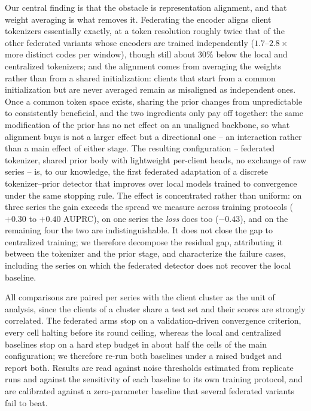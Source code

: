 Our central finding is that the obstacle is representation alignment, and that weight
averaging is what removes it. Federating the encoder aligns client tokenizers essentially
exactly, at a token resolution roughly twice that of the other federated variants whose
encoders are trained independently ($1.7$--$2.8\times$ more distinct codes per window),
though still about $30\%$ below the local and centralized tokenizers; and the alignment
comes from averaging the weights rather than from a shared initialization: clients that
start from a common initialization but are never averaged remain as misaligned as
independent ones. Once a common token space exists, sharing the prior changes from
unpredictable to consistently beneficial, and the two ingredients only pay off together: the
same modification of the prior has no net effect on an unaligned backbone, so what alignment
buys is not a larger effect but a directional one -- an interaction rather than a main
effect of either stage. The resulting configuration -- federated tokenizer, shared prior
body with lightweight per-client heads, no exchange of raw series -- is, to our knowledge,
the first federated adaptation of a discrete tokenizer--prior detector that improves over
local models trained to convergence under the same stopping rule. The effect is concentrated
rather than uniform: on three series the gain exceeds the spread we measure across training
protocols ($+0.30$ to $+0.40$ AUPRC), on one series the \emph{loss} does too ($-0.43$), and
on the remaining four the two are indistinguishable. It does not close the gap to centralized
training; we therefore decompose the residual gap, attributing it between the tokenizer and
the prior stage, and characterize the failure cases, including the series on which the
federated detector does not recover the local baseline.

All comparisons are paired per series with the client cluster as the unit of analysis, since
the clients of a cluster share a test set and their scores are strongly correlated. The
federated arms stop on a validation-driven convergence criterion, every cell halting before
its round ceiling, whereas the local and centralized baselines stop on a hard step budget in
about half the cells of the main configuration; we therefore re-run both baselines under a
raised budget and report both. Results are read against noise thresholds estimated from
replicate runs and against the sensitivity of each baseline to its own training protocol,
and are calibrated against a zero-parameter baseline that several federated variants fail to
beat.

